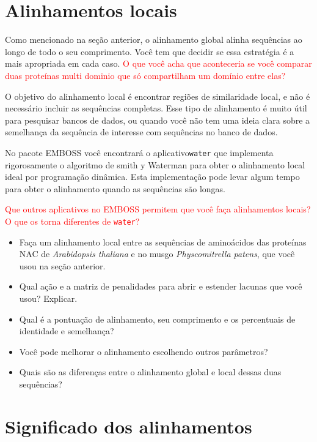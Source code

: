 \documentclass[letter,11pt]{book}
\begin{document}
\section{Alinhamentos locais}

Como mencionado na seção anterior, o alinhamento global alinha sequências ao longo de todo o seu comprimento. Você tem que decidir se essa estratégia é a mais apropriada em cada caso. \textcolor{red}{O que você acha que aconteceria se você comparar duas proteínas multi dominio que só compartilham um domínio entre elas?}

O objetivo do alinhamento local é encontrar regiões de similaridade local, e não é necessário incluir as sequências completas. Esse tipo de alinhamento é muito útil para pesquisar bancos de dados, ou quando você não tem uma ideia clara sobre a semelhança da sequência de interesse com sequências no banco de dados.

No pacote EMBOSS você encontrará o aplicativo\Verb+water+ que implementa rigorosamente o algoritmo de  smith y Waterman \citep{Smith1981} para obter o alinhamento local ideal por programação dinâmica. Esta implementação pode levar algum tempo para obter o alinhamento quando as sequências são longas.

\textcolor{red}{Que outros aplicativos no EMBOSS permitem que você faça alinhamentos locais? O que os torna diferentes de \Verb+water+?}

{\color{red}
\begin{itemize}
\item Faça um alinhamento local entre as sequências de aminoácidos das proteínas NAC de \textit{Arabidopsis thaliana} e no musgo \textit{Physcomitrella patens}, que você usou na seção anterior.
\item Qual ação e a matriz de penalidades para abrir e estender lacunas que você usou? Explicar.
\item Qual é a pontuação de alinhamento, seu comprimento e os percentuais de identidade e semelhança?
\item Você pode melhorar o alinhamento escolhendo outros parâmetros?
\item Quais são as diferenças entre o alinhamento global e local dessas duas sequências?
\end{itemize}
}

\section{Significado dos alinhamentos}
\end{document}
